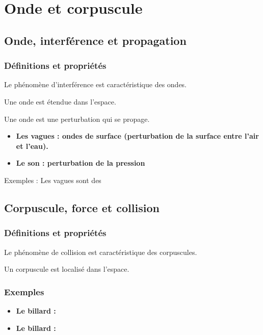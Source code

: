 \chapter{Onde et corpuscule}

\section{Onde, interférence et propagation}
\subsection{Définitions et propriétés}
Le phénomène d'interférence est caractéristique des ondes.
\begin{center}
Une onde est étendue dans l'espace.
\end{center}
\begin{center}
Une onde est une perturbation qui se propage.
\end{center}

\begin{itemize}[leftmargin=1cm, label=, itemsep=1pt]
\item {\bf Les vagues : ondes de surface (perturbation de la surface entre l'air et l'eau).}
\item {\bf Le son : perturbation de la pression}
\end{itemize}
Exemples : Les vagues sont des 

\section{Corpuscule, force et collision}
\subsection{Définitions et propriétés}
Le phénomène de collision est caractéristique des corpuscules.
\begin{center}
Un corpuscule est localisé dans l'espace.
\end{center}
\subsection{Exemples}
\begin{itemize}[leftmargin=1cm, label=, itemsep=1pt]
\item {\bf Le billard : }
\item {\bf Le billard : }
\end{itemize}



